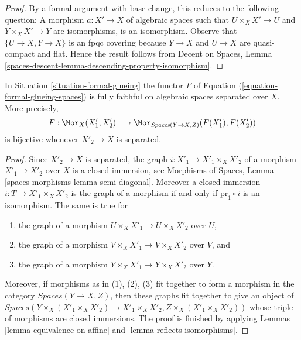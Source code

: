 \begin{proof}
By a formal argument with base change, this reduces to the following
question: A morphism $a : X' \to X$ of algebraic spaces such that
$U \times_X X' \to U$ and $Y \times_X X' \to Y$ are isomorphisms, is
an isomorphism. Observe that $\{U \to X, Y \to X\}$ is an fpqc covering
because $Y \to X$ and $U \to X$ are quasi-compact and flat.
Hence the result follows from
Decent on Spaces, Lemma
\ref{spaces-descent-lemma-descending-property-isomorphism}.
\end{proof}

\begin{lemma}
\label{lemma-fully-faithful-on-separated}
In Situation \ref{situation-formal-glueing} the functor $F$ of
Equation (\ref{equation-formal-glueing-spaces}) is fully faithful
on algebraic spaces separated over $X$. More precisely,
$$
F :
\Mor_X(X'_1, X'_2)
\longrightarrow
\Mor_{\textit{Spaces}(Y \to X, Z)}(F(X'_1), F(X'_2))
$$
is bijective whenever $X'_2 \to X$ is separated.
\end{lemma}

\begin{proof}
Since $X'_2 \to X$ is separated, the graph $i : X'_1 \to X'_1 \times_X X'_2$
of a morphism $X'_1 \to X'_2$ over $X$ is a closed immersion, see
Morphisms of Spaces, Lemma \ref{spaces-morphisms-lemma-semi-diagonal}.
Moreover a closed immersion $i : T \to X'_1 \times_X X'_2$ is the graph of a
morphism if and only if $\text{pr}_1 \circ i$ is an isomorphism.
The same is true for
\begin{enumerate}
\item the graph of a morphism $U \times_X X'_1 \to U \times_X X'_2$ over $U$,
\item the graph of a morphism $V \times_X X'_1 \to V \times_X X'_2$ over $V$,
and
\item the graph of a morphism $Y \times_X X'_1 \to Y \times_X X'_2$ over $Y$.
\end{enumerate}
Moreover, if morphisms as in (1), (2), (3) fit together to form a
morphism in the category $\textit{Spaces}(Y \to X, Z)$, then these
graphs fit together to give an object of
$\textit{Spaces}(Y \times_X (X'_1 \times_X X'_2) \to X'_1 \times_X X'_2,
Z \times_X (X'_1 \times_X X'_2))$
whose triple of morphisms are closed immersions. The proof is finished
by applying Lemmas \ref{lemma-equivalence-on-affine} and
\ref{lemma-reflects-isomorphisms}.
\end{proof}






